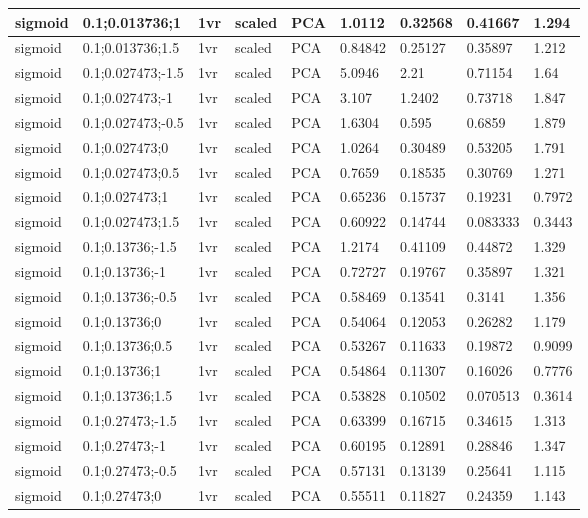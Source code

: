\begin{longtable}{lllllllll}
sigmoid & 0.1;0.013736;1 & 1vr & scaled & PCA & 1.0112 & 0.32568 & 0.41667 & 1.294\\ \hline
sigmoid & 0.1;0.013736;1.5 & 1vr & scaled & PCA & 0.84842 & 0.25127 & 0.35897 & 1.212\\ \hline
sigmoid & 0.1;0.027473;-1.5 & 1vr & scaled & PCA & 5.0946 & 2.21 & 0.71154 & 1.64\\ \hline
sigmoid & 0.1;0.027473;-1 & 1vr & scaled & PCA & 3.107 & 1.2402 & 0.73718 & 1.847\\ \hline
sigmoid & 0.1;0.027473;-0.5 & 1vr & scaled & PCA & 1.6304 & 0.595 & 0.6859 & 1.879\\ \hline
sigmoid & 0.1;0.027473;0 & 1vr & scaled & PCA & 1.0264 & 0.30489 & 0.53205 & 1.791\\ \hline
sigmoid & 0.1;0.027473;0.5 & 1vr & scaled & PCA & 0.7659 & 0.18535 & 0.30769 & 1.271\\ \hline
sigmoid & 0.1;0.027473;1 & 1vr & scaled & PCA & 0.65236 & 0.15737 & 0.19231 & 0.7972\\ \hline
sigmoid & 0.1;0.027473;1.5 & 1vr & scaled & PCA & 0.60922 & 0.14744 & 0.083333 & 0.3443\\ \hline
sigmoid & 0.1;0.13736;-1.5 & 1vr & scaled & PCA & 1.2174 & 0.41109 & 0.44872 & 1.329\\ \hline
sigmoid & 0.1;0.13736;-1 & 1vr & scaled & PCA & 0.72727 & 0.19767 & 0.35897 & 1.321\\ \hline
sigmoid & 0.1;0.13736;-0.5 & 1vr & scaled & PCA & 0.58469 & 0.13541 & 0.3141 & 1.356\\ \hline
sigmoid & 0.1;0.13736;0 & 1vr & scaled & PCA & 0.54064 & 0.12053 & 0.26282 & 1.179\\ \hline
sigmoid & 0.1;0.13736;0.5 & 1vr & scaled & PCA & 0.53267 & 0.11633 & 0.19872 & 0.9099\\ \hline
sigmoid & 0.1;0.13736;1 & 1vr & scaled & PCA & 0.54864 & 0.11307 & 0.16026 & 0.7776\\ \hline
sigmoid & 0.1;0.13736;1.5 & 1vr & scaled & PCA & 0.53828 & 0.10502 & 0.070513 & 0.3614\\ \hline
sigmoid & 0.1;0.27473;-1.5 & 1vr & scaled & PCA & 0.63399 & 0.16715 & 0.34615 & 1.313\\ \hline
sigmoid & 0.1;0.27473;-1 & 1vr & scaled & PCA & 0.60195 & 0.12891 & 0.28846 & 1.347\\ \hline
sigmoid & 0.1;0.27473;-0.5 & 1vr & scaled & PCA & 0.57131 & 0.13139 & 0.25641 & 1.115\\ \hline
sigmoid & 0.1;0.27473;0 & 1vr & scaled & PCA & 0.55511 & 0.11827 & 0.24359 & 1.143\\ \hline

\end{longtable}

